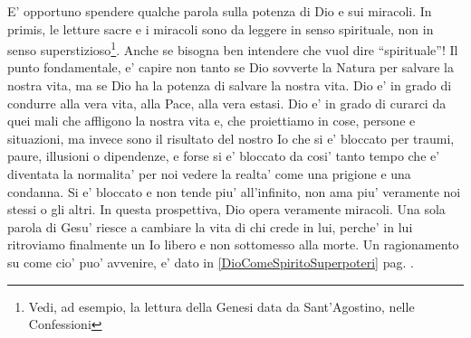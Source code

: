 E' opportuno spendere qualche parola sulla potenza di Dio e sui miracoli. In primis, le letture sacre e i miracoli sono da leggere in senso spirituale, non in senso superstizioso\footnote{Vedi, ad esempio, la lettura della Genesi data da Sant'Agostino, nelle Confessioni}. Anche se bisogna ben intendere che vuol dire ``spirituale''! 
Il punto fondamentale, e' capire non tanto se Dio sovverte la Natura per salvare la nostra vita, ma se Dio ha la potenza di salvare la nostra vita. Dio e' in grado di condurre alla vera vita, alla Pace, alla vera estasi. Dio e' in grado di curarci da quei mali che affligono la nostra vita e, che proiettiamo in cose, persone e situazioni, ma invece sono il risultato del nostro Io che si e' bloccato per traumi, paure, illusioni o dipendenze, e forse si e' bloccato da cosi' tanto tempo che e' diventata la normalita' per noi vedere la realta' come una prigione e una condanna. Si e' bloccato e non tende piu' all'infinito, non ama piu' veramente noi stessi o gli altri. In questa prospettiva, Dio opera veramente miracoli. Una sola parola di Gesu' riesce a cambiare la vita di chi crede in lui, perche' in lui ritroviamo finalmente un Io libero e non sottomesso alla morte. Un ragionamento su come cio' puo' avvenire, e' dato in \ref{DioComeSpiritoSuperpoteri} pag. \pageref{DioComeSpiritoSuperpoteri}.\\

